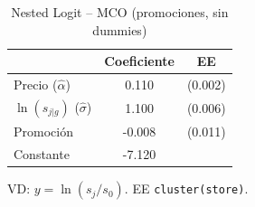 \begin{table}[H]
\centering
\caption{Nested Logit -- MCO (promociones, sin dummies)}
\begin{tabular}{lcc}
\toprule
& Coeficiente & EE \\
\midrule
Precio ($\hat{\alpha}$) & 0.110 & (0.002) \\
$\ln(s_{j|g})$ ($\hat{\sigma}$) & 1.100 & (0.006) \\
Promoci\'on & -0.008 & (0.011) \\
Constante & -7.120 & \\
\bottomrule
\end{tabular}

\smallskip
{\footnotesize\begin{minipage}{0.92\linewidth}VD: $y=\ln(s_j/s_0)$. EE \texttt{cluster(store)}.\end{minipage}}
\end{table}
